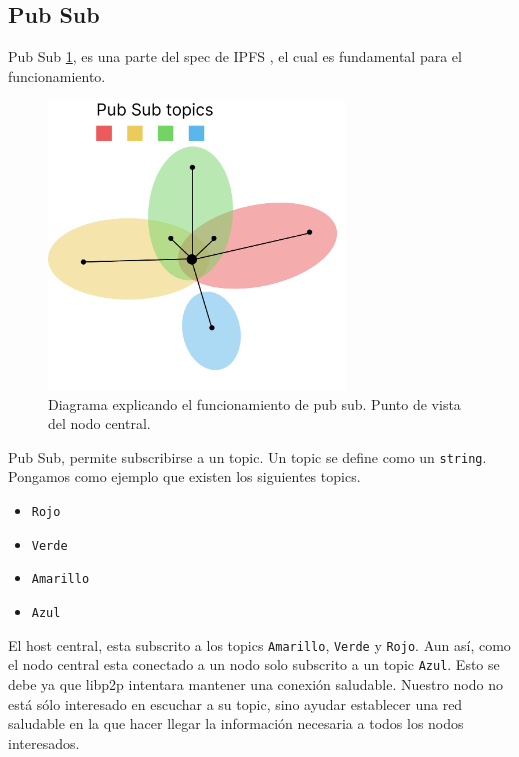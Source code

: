 \subsection{Pub Sub}
Pub Sub \ref{fg:pubSub}, es una parte del spec de IPFS \cite{web:ipfs}, el cual es fundamental para el funcionamiento.
\begin{figure}[h!]
    \centering
    \includegraphics[width=0.7\textwidth]{Figures/Pub Sub.png}
    \caption{Diagrama explicando el funcionamiento de pub sub. Punto de vista del nodo central.}
    \label{fg:pubSub}
\end{figure}
Pub Sub, permite subscribirse a un topic. Un topic se define como un \verb|string|.
Pongamos como ejemplo que existen los siguientes topics.
\begin{itemize}
    \item \verb|Rojo|
    \item \verb|Verde|
    \item \verb|Amarillo|
    \item \verb|Azul|
\end{itemize}
El host central, esta subscrito a los topics \verb|Amarillo|, \verb|Verde| y \verb|Rojo|.  Aun así, como el nodo central esta conectado a un nodo solo subscrito a un topic \verb|Azul|. Esto se debe ya que libp2p intentara mantener una conexión saludable. Nuestro nodo no está sólo interesado en escuchar a su topic, sino ayudar establecer una red saludable en la que hacer llegar la información necesaria a todos los nodos interesados.
